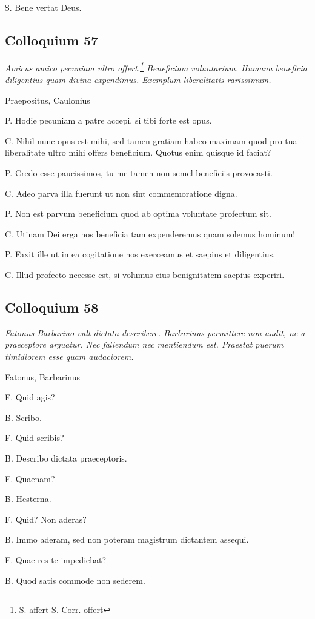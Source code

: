 \documentclass{article}
\begin{document}
S. Bene vertat Deus. 

\subsection{Colloquium 57}
\emph{Amicus amico pecuniam ultro offert.\footnote{S. affert S. Corr. offert} Beneficium voluntarium. Humana beneficia diligentius quam divina expendimus. Exemplum liberalitatis rarissimum.}

Praepositus, Caulonius

P. Hodie pecuniam a patre accepi, si tibi forte est opus. 

C. Nihil nunc opus est mihi, sed tamen gratiam habeo maximam quod pro tua liberalitate ultro mihi offers beneficium. Quotus enim quisque id faciat?

P. Credo esse paucissimos, tu me tamen non semel beneficiis provocasti. 

C. Adeo parva illa fuerunt ut non sint commemoratione digna. 

P. Non est parvum beneficium quod ab optima voluntate profectum sit. 

C. Utinam Dei erga nos beneficia tam expenderemus quam solemus hominum!

P. Faxit ille ut in ea cogitatione nos exerceamus et saepius et diligentius. 

C. Illud profecto necesse est, si volumus eius benignitatem saepius experiri.

\subsection{Colloquium 58}
\emph{Fatonus Barbarino vult dictata describere. Barbarinus permittere non audit, ne a praeceptore arguatur. Nec fallendum nec mentiendum est. Praestat puerum timidiorem esse quam audaciorem.}

Fatonus, Barbarinus

F. Quid agis?

B. Scribo. 

F. Quid scribis?

B. Describo dictata praeceptoris. 

F. Quaenam?

B. Hesterna. 

F. Quid? Non aderas?

B. Immo aderam, sed non poteram magistrum dictantem assequi. 

F. Quae res te impediebat?

B. Quod satis commode non sederem. 
\end{document}
